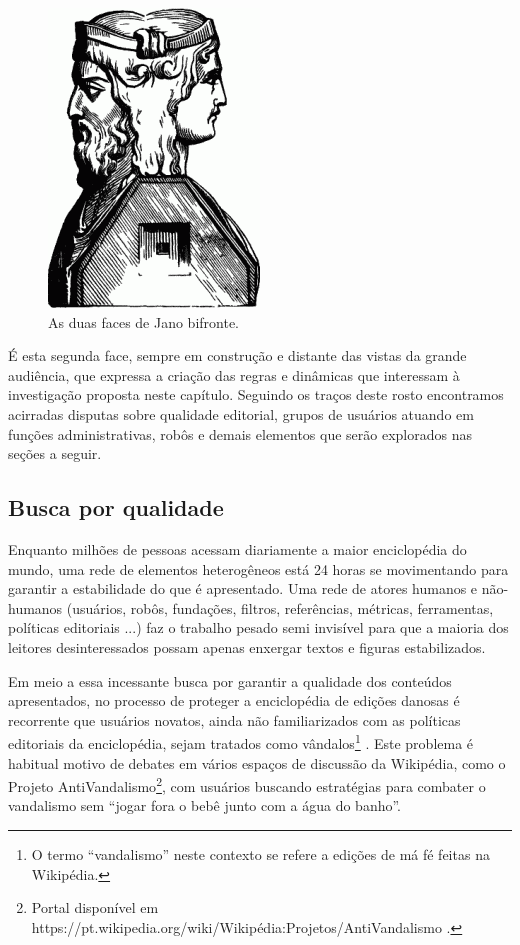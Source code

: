 \begin{figure}[H]
    \centering
    \includegraphics[width=0.5\textwidth]{Images/duas_faces_jano.png}
    \caption{As duas faces de Jano bifronte.}
    \label{fig:duas_faces_jano}
\end{figure}

É esta segunda face, sempre em construção e distante das vistas da grande audiência, que expressa a criação das regras e dinâmicas que interessam à investigação proposta neste capítulo. Seguindo os traços deste rosto encontramos acirradas disputas sobre qualidade editorial, grupos de usuários atuando em funções administrativas, robôs e demais elementos que serão explorados nas seções a seguir.

\subsection{Busca por qualidade}

Enquanto milhões de pessoas acessam diariamente a maior enciclopédia do mundo, uma rede de elementos heterogêneos está 24 horas se movimentando para garantir a estabilidade do que é apresentado. Uma rede de atores humanos e não-humanos (usuários, robôs, fundações, filtros, referências, métricas, ferramentas, políticas editoriais ...) faz o trabalho pesado semi invisível para que a maioria dos leitores desinteressados possam apenas enxergar textos e figuras estabilizados.

Em meio a essa incessante busca por garantir a qualidade dos conteúdos apresentados, no processo de proteger a enciclopédia de edições danosas é recorrente que usuários novatos, ainda não familiarizados com as políticas editoriais da enciclopédia, sejam tratados como vândalos\footnote{O termo ``vandalismo'' neste contexto se refere a edições de má fé feitas na Wikipédia.} \citep{halfaker_snuggle:_2014}. Este problema é habitual motivo de debates em vários espaços de discussão da Wikipédia, como o Projeto AntiVandalismo\footnote{Portal disponível em https://pt.wikipedia.org/wiki/Wikipédia:Projetos/AntiVandalismo .}, com usuários buscando estratégias para combater o vandalismo sem ``jogar fora o bebê junto com a água do banho''.

